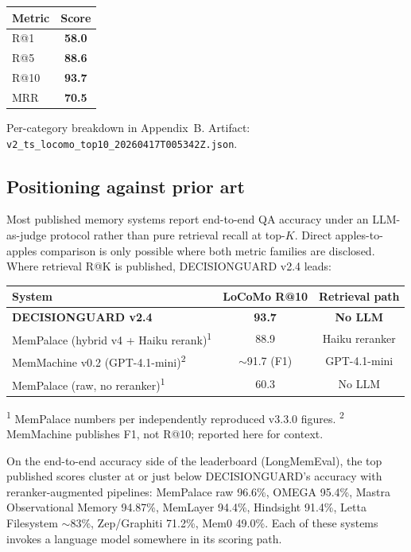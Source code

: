 \documentclass{article}
\begin{document}
\begin{center}
\begin{tabular}{lc}
\toprule
Metric & Score \\
\midrule
R@1  & \textbf{58.0} \\
R@5  & \textbf{88.6} \\
R@10 & \textbf{93.7} \\
MRR  & \textbf{70.5} \\
\bottomrule
\end{tabular}
\end{center}

Per-category breakdown in Appendix~B. Artifact:
\texttt{v2\_ts\_locomo\_top10\_20260417T005342Z.json}.

\subsection{Positioning against prior art}

Most published memory systems report end-to-end QA accuracy under an
LLM-as-judge protocol rather than pure retrieval recall at top-$K$.
Direct apples-to-apples comparison is only possible where both metric
families are disclosed. Where retrieval R@K is published, DECISIONGUARD v2.4
leads:

\begin{center}
\begin{tabular}{lcc}
\toprule
System & LoCoMo R@10 & Retrieval path \\
\midrule
\textbf{DECISIONGUARD v2.4}                                 & \textbf{93.7}            & \textbf{No LLM}    \\
MemPalace (hybrid v4 + Haiku rerank)\textsuperscript{1} & 88.9                  & Haiku reranker     \\
MemMachine v0.2 (GPT-4.1-mini)\textsuperscript{2}    & $\sim$91.7 (F1)          & GPT-4.1-mini       \\
MemPalace (raw, no reranker)\textsuperscript{1}      & 60.3                     & No LLM             \\
\bottomrule
\end{tabular}
\end{center}

\textsuperscript{1} MemPalace numbers per independently reproduced
v3.3.0 figures.
\textsuperscript{2} MemMachine publishes F1, not R@10; reported here
for context.

On the end-to-end accuracy side of the leaderboard (LongMemEval), the
top published scores cluster at or just below DECISIONGUARD's accuracy with
reranker-augmented pipelines: MemPalace raw 96.6\%, OMEGA 95.4\%,
Mastra Observational Memory 94.87\%, MemLayer 94.4\%, Hindsight 91.4\%,
Letta Filesystem $\sim$83\%, Zep/Graphiti 71.2\%, Mem0 49.0\%. Each of
these systems invokes a language model somewhere in its scoring path.
\end{document}
